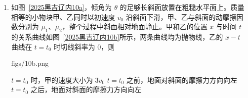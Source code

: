 \documentclass[\gkver]{gaokaozhenti}
\begin{document}
\begin{enumerate}
{C．$t = \frac{\pi}{\omega}$ 时，线框旋转 $180^\circ$，此时依旧是 af 边切割磁场产生电动势，感应电动势不为零，C 错误；

D．$t = 0$ 到 $t = \frac{\pi}{\omega}$ 时，线框 abef 的磁通量变化量为零，线框 bcde 的磁通量变化量为 $\Delta\Phi = 2BS = 2Bl^{2}$

由法拉第电磁感应定律可得平均电动势为 $E = \frac{\Delta\Phi}{\Delta t} = \frac{2B\omega l^{2}}{\pi}$，D 错误。

故选 AB。
}

\item
如图~\ref{2025黑吉辽内10a}，倾角为 $\theta$ 的足够长斜面放置在粗糙水平面上。质量相等的小物块甲、乙同时以初速度 $v_{0}$ 沿斜面下滑，甲、乙与斜面的动摩擦因数分别为 $\mu_{1}$、$\mu_{2}$，整个过程中斜面相对地面静止。甲和乙的位置 $x$ 与时间 $t$ 的关系曲线如图~\ref{2025黑吉辽内10b}所示，两条曲线均为抛物线，乙的 $x-t$ 曲线在 $t = t_{0}$ 时切线斜率为 0，则

{figs/10b.png}

{$t = t_{0}$ 时，甲的速度大小为 $3v_{0}$}
{$t = t_{0}$ 之前，地面对斜面的摩擦力方向向左}
{$t = t_{0}$ 之后，地面对斜面的摩擦力方向向左}

\end{enumerate}
\end{document}
